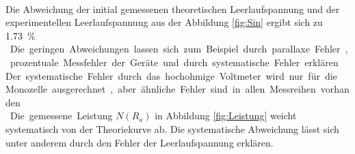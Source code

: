 \\Die Abweichung der initial gemessenen theoretischen Leerlaufspannung und der experimentellen Leerlaufspannung aus der Abbildung \ref{fig:Sin} ergibt sich zu \SI{1.73}\%.
\\Die geringen Abweichungen lassen sich zum Beispiel durch parallaxe Fehler, prozentuale Messfehler der Geräte und durch systematische Fehler erklären.
Der systematische Fehler durch das hochohmige Voltmeter wird nur für die Monozelle ausgerechnet, aber ähnliche Fehler sind in allen Messreihen vorhanden.
\\Die gemessene Leistung $N(R_{a})$ in Abbildung \ref{fig:Leistung} weicht systematisch von der Theoriekurve ab.
Die systematische Abweichung lässt sich unter anderem durch den Fehler der Leerlaufspannung erklären.


\FloatBarrier
